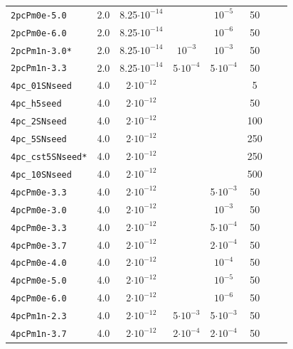 \documentclass[iop,apj,numberedappendix,twocolappendix]{emulateapj}
\begin{document}
\begin{table}
\begin{tabular}{lccccccc}
\texttt{2pcPm0e-5.0  }   & 2.0 & 8.25$\cdot10^{-14}$ &                  & $     10^{-5}$  &  50  \\
\texttt{2pcPm0e-6.0  }   & 2.0 & 8.25$\cdot10^{-14}$ &                  & $     10^{-6}$  &  50  \\
\texttt{2pcPm1n-3.0* }   & 2.0 & 8.25$\cdot10^{-14}$ & $     10^{-3}$   & $     10^{-3}$  &  50  \\
\texttt{2pcPm1n-3.3  }   & 2.0 & 8.25$\cdot10^{-14}$ & 5$\cdot10^{-4}$  & 5$\cdot10^{-4}$ &  50  \\
\texttt{4pc\_01SNseed }  & 4.0 & 2$\cdot10^{-12}$    &                  &                 &  5   \\
\texttt{4pc\_h5seed   }  & 4.0 & 2$\cdot10^{-12}$    &                  &                 &  50  \\
\texttt{4pc\_2SNseed  }  & 4.0 & 2$\cdot10^{-12}$    &                  &                 & 100  \\
\texttt{4pc\_5SNseed  }  & 4.0 & 2$\cdot10^{-12}$    &                  &                 & 250  \\
\texttt{4pc\_cst5SNseed*}& 4.0 & 2$\cdot10^{-12}$    &                  &                 & 250  \\
\texttt{4pc\_10SNseed }  & 4.0 & 2$\cdot10^{-12}$    &                  &                 & 500  \\
\texttt{4pcPm0e-3.3  }   & 4.0 & 2$\cdot10^{-12}$    &                  & 5$\cdot10^{-3}$ &  50  \\
\texttt{4pcPm0e-3.0  }   & 4.0 & 2$\cdot10^{-12}$    &                  & $     10^{-3}$  &  50  \\
\texttt{4pcPm0e-3.3  }   & 4.0 & 2$\cdot10^{-12}$    &                  & 5$\cdot10^{-4}$ &  50  \\
\texttt{4pcPm0e-3.7  }   & 4.0 & 2$\cdot10^{-12}$    &                  & 2$\cdot10^{-4}$ &  50  \\
\texttt{4pcPm0e-4.0  }   & 4.0 & 2$\cdot10^{-12}$    &                  & $     10^{-4}$  &  50  \\
\texttt{4pcPm0e-5.0  }   & 4.0 & 2$\cdot10^{-12}$    &                  & $     10^{-5}$  &  50  \\
\texttt{4pcPm0e-6.0  }   & 4.0 & 2$\cdot10^{-12}$    &                  & $     10^{-6}$  &  50  \\
\texttt{4pcPm1n-2.3  }   & 4.0 & 2$\cdot10^{-12}$    & 5$\cdot10^{-3}$  & 5$\cdot10^{-3}$ &  50  \\
\texttt{4pcPm1n-3.7}     & 4.0 & 2$\cdot10^{-12}$    & 2$\cdot10^{-4}$  & 2$\cdot10^{-4}$ &  50    
\end{tabular}
\end{table}
\end{document}
